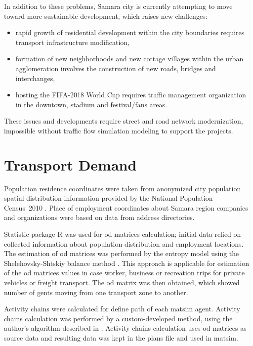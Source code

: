 In addition to these problems, Samara city is currently attempting to move toward more sustainable development, which raises new challenges:
\begin{itemize}
\item rapid growth of residential development within the city boundaries requires transport infrastructure modification,
\item formation of new neighborhoods and new cottage villages within the urban agglomeration involves the construction of new roads, bridges and interchanges,
\item hosting the FIFA-2018 World Cup requires traffic management organization in the downtown, stadium and festival/fans areas.
\end{itemize}

These issues and developments require street and road network modernization, impossible without traffic flow simulation modeling to support the projects.

\section{Transport Demand}
Population residence coordinates were taken from anonymized city population spatial distribution information provided by the National Population Census~2010 \citep[][]{GKS_2010}. Place of employment coordinates about Samara region companies and organizations were based on data from address directories.

Statistic package R was used for \gls{od} matrices calculation; initial data relied on collected information about population distribution and employment locations. The estimation of \gls{od} matrices was performed by the entropy model using the Shelehovsky-Shtskiy balance method \citep[][]{Nurminski_2009, Autodor_2013, Shvetsov_2003}. This approach is applicable for estimation of the \gls{od} matrices values in case worker, business or recreation trips for private vehicles or freight transport. The \gls{od} matrix was then obtained, which showed number of gents moving from one transport zone to another.

Activity chains were calculated for define path of each \gls{matsim} agent. Activity chains calculation was performed by a custom-developed method, using the author's algorithm described in \citet[][]{SaprykinaEtAl_2012}. Activity chains calculation uses \gls{od} matrices as source data and resulting data was kept in the plans file and used in \gls{matsim}.

